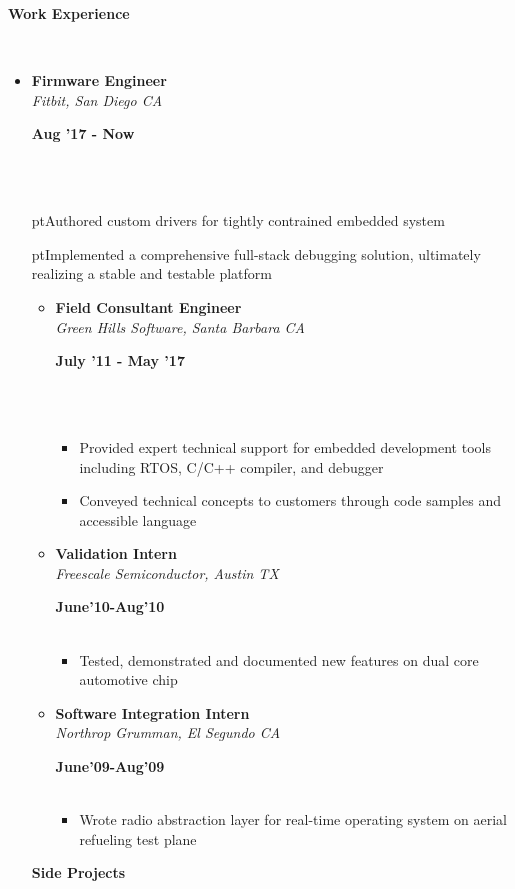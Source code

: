 \documentclass[a4paper,11pt]{article}
\newcommand{\isep}{-1 pt}
\newcommand{\lsep}{-0.2cm}
\newcommand{\resheading}[1]{{\small \colorbox{mygrey}{\begin{minipage}{0.975\textwidth}{\textbf{#1 \vphantom{p\^{E}}}}\end{minipage}}}}
\newcommand{\workexp}[4]{
\begin{minipage}[t]{7cm}
\begin{flushleft}
\textbf{#1} \\
\indent \emph{#2}\\
\end{flushleft}
\end{minipage}
\hfill
\begin{minipage}[t]{7cm}
\begin{flushright}
\textbf{#3} \\
\indent #4 \\
\end{flushright}
\end{minipage}
}
\begin{document}
\resheading{\textbf{Work Experience} }\\[\lsep]
\begin{itemize}
\item
\workexp{Firmware Engineer}{Fitbit, San Diego CA}{Aug '17 - Now}{}
\\[-0.3cm]
	\begin{itemize}\itemsep \isep Authored custom drivers for tightly contrained embedded system
	\begin{itemize}\itemsep \isep Implemented a comprehensive full-stack debugging solution, ultimately realizing a stable and testable platform
	\begin{itemize}\itemsep \isep Provided on-site manufacturing support, significantly improving yields and quality above industry standards




\item
\workexp{Field Consultant Engineer}{Green Hills Software, Santa Barbara CA}{July '11 - May '17}{}
\\[-0.3cm]
	\begin{itemize}\itemsep \isep
	\item Provided expert technical support for embedded development tools including RTOS, C/C++ compiler, and debugger
	\item Conveyed technical concepts to customers through code samples and accessible language
	\end{itemize}

\item
\workexp{Validation Intern}{Freescale Semiconductor, Austin TX}{June'10-Aug'10}{}
	\begin{itemize}\itemsep \isep
	\item Tested, demonstrated and documented new features on dual core automotive chip
	\end{itemize}
\item
\workexp{Software Integration Intern}{Northrop Grumman, El Segundo CA}{June'09-Aug'09}{}
	\begin{itemize}\itemsep \isep
	\item Wrote radio abstraction layer for real-time operating system on aerial refueling test plane
	\end{itemize}
\end{itemize}



\resheading{\textbf{Side Projects}}\\[\lsep]


\end{itemize}
\end{itemize}
\end{itemize}
\end{document}
